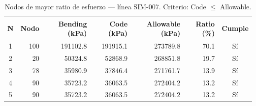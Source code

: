 \begin{table}[htbp]
  \centering
  \small
  \caption{Nodos de mayor ratio de esfuerzo — línea SIM-007. Criterio: Code $\leq$ Allowable.}
  \label{tab:top5-ratio}
  \begin{tabular}{crrrrrc}
    \toprule
    N & Nodo & Bending (\si{kPa}) & Code (\si{kPa}) & Allowable (\si{kPa}) & Ratio (\%) & Cumple \\
    \midrule
    1 & 100 & \num{191102.8} & \num{191915.1} & \num{273789.8} & 70.1 & Sí \\
    2 & 20 & \num{50324.8} & \num{52868.9} & \num{268851.8} & 19.7 & Sí \\
    3 & 78 & \num{35980.9} & \num{37846.4} & \num{271761.7} & 13.9 & Sí \\
    4 & 90 & \num{35723.2} & \num{36063.5} & \num{272404.2} & 13.2 & Sí \\
    5 & 90 & \num{35723.2} & \num{36063.5} & \num{272404.2} & 13.2 & Sí \\
    \bottomrule
  \end{tabular}
\end{table}
